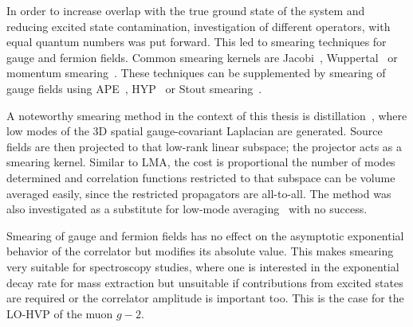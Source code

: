 In order to increase overlap with the true ground state of the system and reducing excited state contamination, investigation of different operators, with equal quantum numbers was put forward.
This led to smearing techniques for gauge and fermion fields.
Common smearing kernels are Jacobi~\cite{GUSKEN1989,PhysRevD.56.2743,Collins:1992fj,UKQCD:1993gym}, Wuppertal~\cite{GUSKEN1990361} or momentum smearing~\cite{Bali:2016lva}.
These techniques can be supplemented by smearing of gauge fields using APE~\cite{ALBANESE1987163}, HYP~\cite{Hasenfratz:2001hp} or Stout smearing~\cite{PhysRevD.69.054501}.


A noteworthy smearing method in the context of this thesis is distillation~\cite{HadronSpectrum:2009krc,Knechtli:2022bji}, where low modes of the 3D spatial gauge-covariant Laplacian are generated.
Source fields are then projected to that low-rank linear subspace; the projector acts as a smearing kernel.
Similar to LMA, the cost is proportional the number of modes determined and correlation functions restricted to that subspace can be volume averaged easily, since the restricted propagators are all-to-all.
The method was also investigated as a substitute for low-mode averaging~\cite{Bushnaq:2023} with no success.

Smearing of gauge and fermion fields has no effect on the asymptotic exponential behavior of the correlator but modifies its absolute value.
This makes smearing very suitable for spectroscopy studies, where one is interested in the exponential decay rate for mass extraction but unsuitable if contributions from excited states are required or the correlator amplitude is important too.
This is the case for the LO-HVP of the muon $g-2$.


